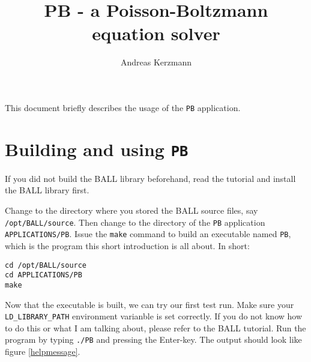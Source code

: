 \documentclass[12pt,twoside,a4paper]{article}
\author{Andreas Kerzmann}
\title{PB - a Poisson-Boltzmann equation solver}
\begin{document}
This document briefly describes the usage of the {\tt PB} application.

\section{Building and using {\tt PB}}

If you did not build the BALL library beforehand, read the tutorial and
install the BALL library first.

Change to the directory where you stored the BALL source files, say {\tt
/opt/BALL/source}. Then change to the directory of the {\tt PB}
application {\tt APPLICATIONS/PB}. Issue the {\tt make} command to build an
executable named {\tt PB}, which is the program this short introduction is
all about. In short:
\begin{verbatim}
cd /opt/BALL/source
cd APPLICATIONS/PB
make
\end{verbatim}

Now that the executable is built, we can try our first test run. Make sure
your {\tt LD\_LIBRARY\_PATH} environment varianble is set correctly. If you
do not know how to do this or what I am talking about, please refer to the
BALL tutorial. Run the program by typing {\tt ./PB} and pressing the
Enter-key. The output should look like figure \ref{helpmessage}.
\end{document}
